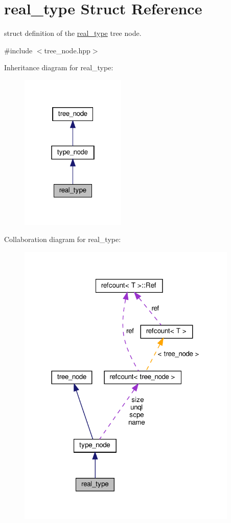 \hypertarget{structreal__type}{}\section{real\+\_\+type Struct Reference}
\label{structreal__type}


struct definition of the \hyperlink{structreal__type}{real\+\_\+type} tree node.  




{\ttfamily \#include $<$tree\+\_\+node.\+hpp$>$}



Inheritance diagram for real\+\_\+type\+:
\nopagebreak
\begin{figure}[H]
\begin{center}
\leavevmode
\includegraphics[width=142pt]{d9/d38/structreal__type__inherit__graph}
\end{center}
\end{figure}


Collaboration diagram for real\+\_\+type\+:
\nopagebreak
\begin{figure}[H]
\begin{center}
\leavevmode
\includegraphics[width=297pt]{da/d79/structreal__type__coll__graph}
\end{center}
\end{figure}
